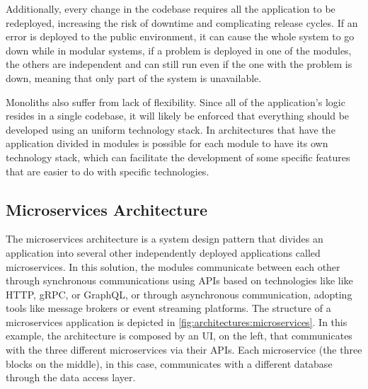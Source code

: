 Additionally, every change in the codebase requires all the application to be
redeployed, increasing the risk of downtime and complicating release cycles. If
an error is deployed to the public environment, it can cause the whole system
to go down while in modular systems, if a problem is deployed in one of the
modules, the others are independent and can still run even if the one with
the problem is down, meaning that only part of the system is unavailable\cite{7333476,AWSMonolithMicroservices}.

Monoliths also suffer from lack of flexibility. Since all of the application's
logic resides in a single codebase, it will likely be enforced that everything
should be developed using an uniform technology stack. In architectures that
have the application divided in modules is possible for each module to have
its own technology stack, which can facilitate the development of some specific
features that are easier to do with specific technologies\cite{IBMMonolith}.
\subsection{Microservices Architecture}
The microservices architecture is a system design pattern that divides an
application into several other independently deployed applications called
microservices\cite{7436659}.
In this solution, the modules communicate between each other through
synchronous communications using \gls{API}s based on technologies like like
\gls{HTTP}, \gls{gRPC}, or GraphQL, or through asynchronous communication,
adopting tools like message brokers or event streaming platforms\cite{7436659}.
The structure of a microservices application is depicted in \ref{fig:architectures:microservices}.
In this example, the architecture is composed by an \gls{UI}, on the left,
that communicates with the three different microservices via their \gls{API}s.
Each microservice (the three blocks on the middle), in this case, communicates
with a different database through the data access layer.

